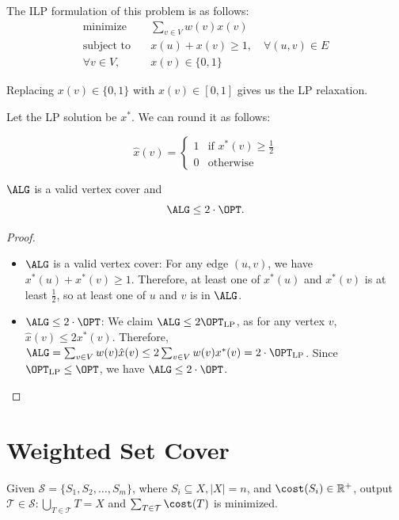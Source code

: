 The ILP formulation of this problem is as follows:
\begin{align*}
	\text{minimize} \quad   & \sum_{v \in V} w(v) x(v)                       \\
	\text{subject to} \quad & x(u) + x(v) \geq 1, \quad \forall (u, v) \in E \\
	\forall v \in V, \quad  & x(v) \in \{0, 1\}
\end{align*}

Replacing $x(v) \in \{0, 1\}$ with $x(v) \in [0, 1]$ gives us the LP relaxation.

Let the LP solution be $x^*$. We can round it as follows:

\[ \hat{x}(v) = \begin{cases}
		1 & \text{if } x^*(v) \geq \frac{1}{2} \\
		0 & \text{otherwise}
	\end{cases} \]

\begin{theorem}
	$\ALG$ is a valid vertex cover and
	\[ \ALG \leq 2 \cdot \OPT. \]
\end{theorem}
\begin{proof}
	\begin{itemize}
		\item $\ALG$ is a valid vertex cover: For any edge $(u, v)$, we have $x^*(u) + x^*(v) \geq 1$. Therefore, at least one of $x^*(u)$ and $x^*(v)$ is at least $\frac{1}{2}$, so at least one of $u$ and $v$ is in $\ALG$.
		\item $\ALG \leq 2 \cdot \OPT$: We claim $\ALG \le 2\OPT_\text{LP}$, as for any vertex $v$, $\hat{x}(v) \le 2 x^*(v)$. Therefore, $\ALG = \sum_{v \in V} w(v) \hat{x}(v) \leq 2 \sum_{v \in V} w(v) x^*(v) = 2 \cdot \OPT_\text{LP}$. Since $\OPT_\text{LP} \leq \OPT$, we have $\ALG \leq 2 \cdot \OPT$.
	\end{itemize}
\end{proof}

\section{Weighted Set Cover}

\begin{problem}
Given $\mathcal S = \{S_1, S_2, \ldots, S_m\}$, where $S_i \subseteq X, |X| = n$, and $\cost(S_i) \in \mathbb R^+$, output $\mathcal T\in \mathcal S: \bigcup_{T\in \mathcal T} T = X$ and $\sum_{T \in \mathcal T} \cost(T)$ is minimized.
\end{problem}

